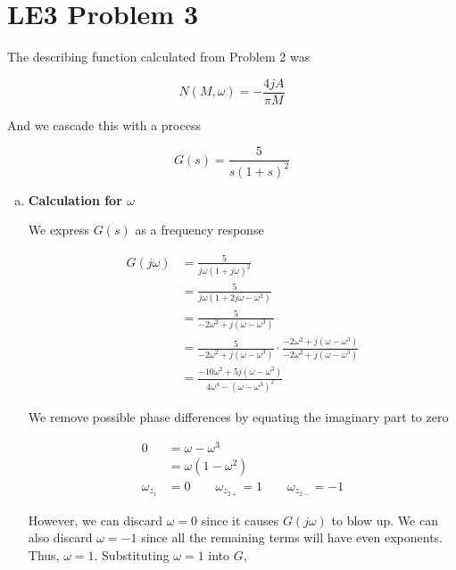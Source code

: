 \documentclass[12pt,a4paper]{article}
\begin{document}
\setcounter{page}{1}

\section*{LE3 Problem 3}
\bigskip

The describing function calculated from Problem 2 was

\begin{equation}
	N(M,\omega) = -\frac{4jA}{\pi M} \label{eq:N}
\end{equation}

And we cascade this with a process

\begin{equation}
	G(s) = \frac{5}{s(1+s)^2} \label{eq:G}
\end{equation}

\begin{enumerate}[a)]

\item \textbf{Calculation for $\omega$}

We express $G(s)$ as a frequency response

\begin{align}
	G(j\omega) &= \frac{5}{j\omega (1 + j\omega)^2} \\
	&= \frac{5}{j\omega (1 + 2j\omega - \omega^2)} \\
	&= \frac{5}{-2\omega^2 + j(\omega - \omega^3)} \\
	&= \frac{5}{-2\omega^2 + j(\omega - \omega^3)} \cdot \frac{-2\omega^2 + j(\omega - \omega^3)}{-2\omega^2 + j(\omega - \omega^3)} \\
	&= \frac{-10\omega^2 + 5j(\omega - \omega^3)}{4\omega^4 - (\omega - \omega^3)^2}
\end{align}

We remove possible phase differences by equating the imaginary part to zero

\begin{align}
	0 &= \omega - \omega^3 \\
	&= \omega(1 - \omega^2) \\
	\omega_{z_1} &= 0 \qquad \omega_{z_{2+}} = 1 \qquad \omega_{z_{2-}} = -1 \label{eq:omega}
\end{align}

However, we can discard $\omega = 0$ since it causes $G(j\omega)$ to blow up. We can also discard $\omega = -1$ since all the remaining terms will have even exponents. Thus, $\boxed{\omega = 1}$. Substituting $\omega = 1$ into $G$,


\end{enumerate}
\end{document}
